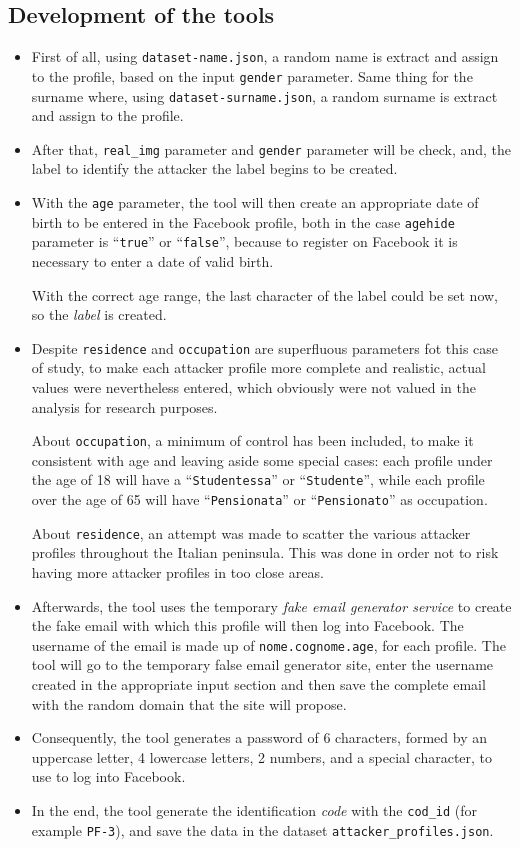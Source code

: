 \subsection{Development of the tools}
\begin{itemize}
	\item First of all, using \texttt{dataset-name.json}, a random name is extract and assign to the profile, based on the input \texttt{gender} parameter. Same thing for the surname where, using \texttt{dataset-surname.json}, a random surname is extract and assign to the profile.
	\item After that, \texttt{real\_img} parameter and \texttt{gender} parameter will be check, and, the label to identify the attacker the label begins to be created.
	\item With the \texttt{age} parameter, the tool will then create an appropriate date of birth to be entered in the Facebook profile, both in the case \texttt{agehide} parameter is ``\texttt{true}'' or ``\texttt{false}'', because to register on Facebook it is necessary to enter a date of valid birth. \par \noindent With the correct age range, the last character of the label could be set now, so the \textit{label} is created.
	\item Despite \texttt{residence} and \texttt{occupation} are superfluous parameters fot this case of study, to make each attacker profile more complete and realistic, actual values were nevertheless entered, which obviously were not valued in the analysis for research purposes. \par \noindent About \texttt{occupation}, a minimum of control has been included, to make it consistent with age and leaving aside some special cases: each profile under the age of 18 will have a ``\texttt{Studentessa}'' or ``\texttt{Studente}'', while each profile over the age of 65 will have ``\texttt{Pensionata}'' or ``\texttt{Pensionato}'' as occupation. \par \noindent About \texttt{residence}, an attempt was made to scatter the various attacker profiles throughout the Italian peninsula. This was done in order not to risk having more attacker profiles in too close areas.
	\item Afterwards, the tool uses the temporary \textit{fake email generator service}\parencite{site:fake-email} to create the fake email with which this profile will then log into Facebook. The username of the email is made up of \texttt{nome.cognome.age}, for each profile. The tool will go to the temporary false email generator site, enter the username created in the appropriate input section and then save the complete email with the random domain that the site will propose.
	\item Consequently, the tool generates a password of 6 characters, formed by an uppercase letter, 4 lowercase letters, 2 numbers, and a special character, to use to log into Facebook.
	\item In the end, the tool generate the identification \textit{code} with the \texttt{cod\_id} (for example \texttt{PF-3}), and save the data in the dataset \texttt{attacker\_profiles.json}.
\end{itemize}
 
